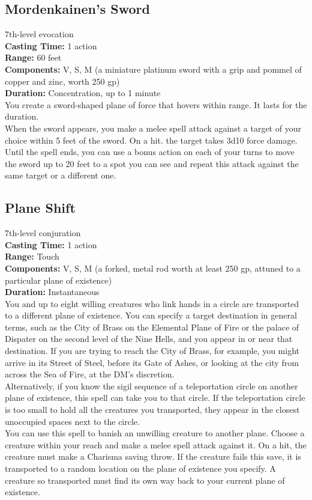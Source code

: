 \documentclass[11pt, A4paper, english]{article}
\begin{document}
		\subsection{Mordenkainen’s Sword}
7th-level evocation \\
\textbf{Casting Time:} 1 action \\
\textbf{Range:} 60 feet \\
\textbf{Components:} V, S, M (a miniature platinum sword with a grip and pommel of copper and zinc, worth 250 gp) \\
\textbf{Duration:} Concentration, up to 1 minute \\
You create a sword-shaped plane of force that hovers within range. It lasts for the duration. \\
When the sword appears, you make a melee spell attack against a target of your choice within 5 feet of the sword. On a hit. the target takes 3d10 force damage. Until the spell ends, you can use a bonus action on each of your turns to move the sword up to 20 feet to a spot you can see and repeat this attack against the same target or a different one.

		\subsection{Plane Shift}
7th-level conjuration \\
\textbf{Casting Time:} 1 action \\
\textbf{Range:} Touch \\
\textbf{Components:} V, S, M (a forked, metal rod worth at least 250 gp, attuned to a particular plane of existence) \\
\textbf{Duration:} Instantaneous \\
You and up to eight willing creatures who link hands in a circle are transported to a different plane of existence. You can specify a target destination in general terms, such as the City of Brass on the Elemental Plane of Fire or the palace of Dispater on the second level of the Nine Hells, and you appear in or near that destination. If you are trying to reach the City of Brass, for example, you might arrive in its Street of Steel, before its Gate of Ashes, or looking at the city from across the Sea of Fire, at the DM’s discretion. \\
Alternatively, if you know the sigil sequence of a teleportation circle on another plane of existence, this spell can take you to that circle. If the teleportation circle is too small to hold all the creatures you transported, they appear in the closest unoccupied spaces next to the circle. \\
You can use this spell to banish an unwilling creature to another plane. Choose a creature within your reach and make a melee spell attack against it. On a hit, the creature must make a Charisma saving throw. If the creature fails this save, it is transported to a random location on the plane of existence you specify. A creature so transported must find its own way back to your current plane of existence.
\end{document}
